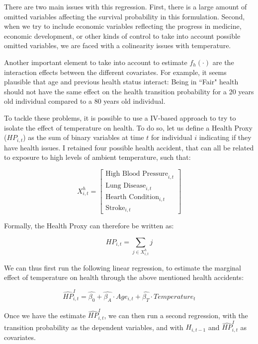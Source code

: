 \documentclass{article}
\begin{document}
There are two main issues with this regression. 
First, there is a large amount of omitted variables
affecting the survival probability in this formulation.
Second, when we try to include economic variables reflecting 
the progress in medicine, economic development, or 
other kinds of control to take into account possible
omitted variables, 
we are faced with a colinearity issues
with temperature. 

Another important element to take into account to estimate 
$f_{h}(\cdot)$ are the interaction 
effects between the different covariates.
For example, it seems plausible that age and previous health status interact:
Being in ``Fair"
health should not have the same effect on the health transition probability 
for a 20 years old individual compared to a 80 years old individual. 

To tackle these problems, it is possible to use a 
IV-based approach to try to isolate the effect of
temperature on health. 
To do so, let us define a Health Proxy ($HP_{i,t}$) as 
the sum of binary variables at time $t$ for individual 
$i$ indicating if they have health issues.
I retained four possible health accident, 
that can all be related to exposure to 
high levels of ambient temperature, such that: 

$$
    X_{i,t}^{h} =
    \begin{bmatrix}
        \text{High Blood Pressure}_{i,t} \\
        \text{Lung Disease}_{i,t} \\ 
        \text{Hearth Condition}_{i,t} \\ 
        \text{Stroke}_{i,t}
    \end{bmatrix}
$$

Formally, the Health Proxy can therefore be written as:

\begin{equation}
    HP_{i,t} = \sum_{j\in X^{h}_{i,t}} j
\end{equation}

We can thus first run the following linear regression,
to estimate the marginal effect of temperature on health
through the above mentioned health accidents:

\begin{equation}
    \widehat{HP}_{i,t}^{I} =  \widehat{\beta_0} +
    \widehat{\beta_{A}} \cdot Age_{i,t} +
    \widehat{\beta_{T}} \cdot Temperature_{t}
\end{equation}

Once we have the estimate $\widehat{HP}_{i,t}^{I}$, we can
then run a second regression, with the transition probability 
as the dependent variables, and with $H_{i,t-1}$ and 
$\widehat{HP}_{i,t}^{I}$ as covariates.
\end{document}
